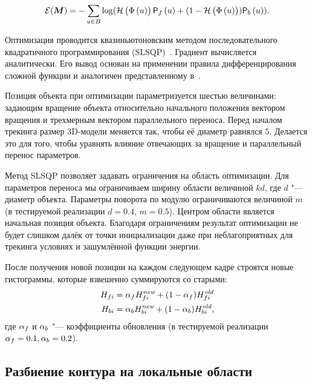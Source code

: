 \begin{equation}\label{eqn:err_func}
    \mathcal{E}(\bm{M}) = - \sum\limits_{\mathnormal{u} \in B}
        \log(\mathcal{H} \left( \Phi \left( \mathnormal{u} \right) \right) \mathsf{P}_f \left( \mathnormal{u} \right) + (1 - \mathcal{H} \left( \Phi \left( \mathnormal{u} \right) \right))\mathsf{P}_b \left( \mathnormal{u} \right))
\text{.}
\end{equation}

Оптимизация проводится квазиньютоновским методом последовательного
квадратичного программирования (SLSQP)~\cite{SLSQP}.
Градиент вычисляется аналитически.
Его вывод основан на применении правила дифференцирования сложной функции и
аналогичен представленному в~\cite{Tjaden2018}.

Позиция объекта при оптимизации параметризуется шестью величинами:
задающим вращение объекта относительно начального положения вектором вращения
и трехмерным вектором параллельного переноса.
Перед началом трекинга размер 3D-модели меняется так, чтобы её диаметр равнялся
$5$.
Делается это для того, чтобы уравнять влияние отвечающих за вращение и
параллельный перенос параметров.

Метод SLSQP позволяет задавать ограничения на область оптимизации.
Для параметров переноса мы ограничиваем ширину области величиной $kd$,
где $d$ "--- диаметр объекта.
Параметры поворота по модулю ограничиваются величиной $m$
(в тестируемой реализации $d =0.4$, $m = 0.5$).
Центром области является начальная позиция объекта.
Благодаря ограничениям результат оптимизации не будет слишком далёк от точки
инициализации даже при неблагоприятных для трекинга условиях и зашумлённой
функции энергии.

После получения новой позиции на каждом следующем кадре строятся новые
гистограммы, которые взвешенно суммируются со старыми:
\begin{align}
    H_{fi} &= \alpha_{f} H_{fi}^{\text{\it new}} + (1 - \alpha_{f})
        H_{fi}^{\text{\it old}} \\
    H_{bi} &= \alpha_{b} H_{bi}^{\text{\it new}} + (1 - \alpha_{b})
        H_{bi}^{\text{\it old}}
\text{,}
\end{align}
где $\alpha_{f}$ и $\alpha_{b}$ "--- коэффициенты обновления (в тестируемой
реализации $\alpha_{f} = 0.1, \alpha_{b} = 0.2$).

\subsection{Разбиение контура на локальные области}\label{local-areas}

